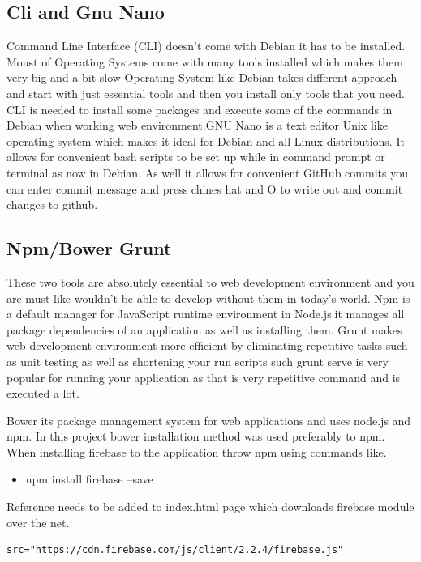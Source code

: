 \begin{itemize}
\subsection{Cli and Gnu Nano}
\bigbreak
Command Line Interface (CLI) doesn’t come with Debian it has to be installed. Moust of Operating Systems come with many tools installed which makes them very big and a bit slow Operating System like Debian takes different approach and start with just essential tools and then you install only tools that you need. CLI is needed to install some packages and execute some of the commands in Debian when working web environment.GNU Nano is a text editor Unix like operating system which makes it ideal for Debian and all Linux distributions. It allows for convenient bash scripts to be set up while in command prompt or terminal as now in Debian. As well it allows for convenient GitHub commits you can enter commit message and press chines hat and O to write out and commit changes to github.


\subsection{Npm/Bower Grunt}
\bigbreak
These two tools are absolutely essential to web development environment and you are must like wouldn’t be able to develop without them in today’s world. Npm is a default manager for JavaScript runtime environment in Node.js.it manages all package dependencies of an application as well as installing them. Grunt makes web development environment more efficient by eliminating repetitive tasks such as unit testing as well as shortening your run scripts such grunt serve is very popular for running your application as that is very repetitive command and is executed a lot.


\bigbreak

Bower its package management system for web applications and uses node.js and npm.
In this project bower installation method was used preferably to npm. When installing firebase to the application throw npm using commands like.

\begin{itemize}
	\item npm install firebase –save
\end{itemize}
Reference needs to be added to index.html page which downloads firebase module over the net.


\begin{verbatim}
src="https://cdn.firebase.com/js/client/2.2.4/firebase.js"
\end{verbatim}





\end{itemize}
